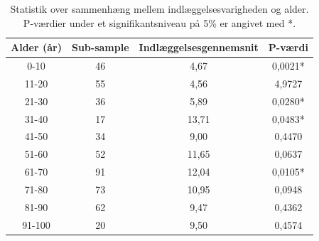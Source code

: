\begin{table}[H]
\centering
\begin{tabular}{|c|c|c|c|}
\hline
\multicolumn{1}{|l|}{\textbf{Alder (år)}} & \multicolumn{1}{l|}{\textbf{Sub-sample}} & \multicolumn{1}{l|}{\textbf{Indlæggelsesgennemsnit}} & \multicolumn{1}{l|}{\textbf{P-værdi}} \\ \hline
0-10                                      & 46                                       & 4,67                                                 & 0,0021*                               \\ \hline
11-20                                     & 55                                       & 4,56                                                 & 4,9727                                \\ \hline
21-30                                     & 36                                       & 5,89                                                 & 0,0280*                               \\ \hline
31-40                                     & 17                                       & 13,71                                                & 0,0483*                               \\ \hline
41-50                                     & 34                                       & 9,00                                                 & 0,4470                                \\ \hline
51-60                                     & 52                                       & 11,65                                                & 0,0637                                \\ \hline
61-70                                     & 91                                       & 12,04                                                & 0,0105*                               \\ \hline
71-80                                     & 73                                       & 10,95                                                & 0,0948                                \\ \hline
81-90                                     & 62                                       & 9,47                                                 & 0,4362                            \\ \hline
91-100                                    & 20                                       & 9,50                                                 & 0,4574                                \\ \hline
\end{tabular}
\caption{Statistik over sammenhæng mellem indlæggelsesvarigheden og alder. P-værdier under et signifikantsniveau på 5\% er angivet med *.}
\label{alderogindlaegtab}
\end{table}

